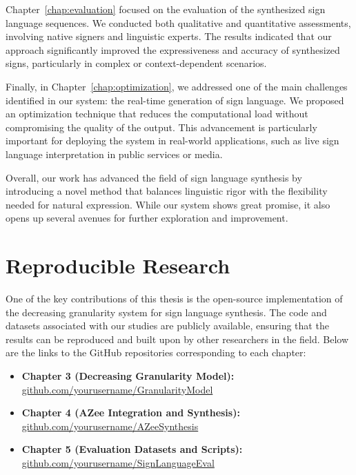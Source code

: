 \documentclass[../../main.tex]{subfiles}
\begin{document}
Chapter~\ref{chap:evaluation} focused on the evaluation of the synthesized sign language sequences. We conducted both qualitative and quantitative assessments, involving native signers and linguistic experts. The results indicated that our approach significantly improved the expressiveness and accuracy of synthesized signs, particularly in complex or context-dependent scenarios.

Finally, in Chapter~\ref{chap:optimization}, we addressed one of the main challenges identified in our system: the real-time generation of sign language. We proposed an optimization technique that reduces the computational load without compromising the quality of the output. This advancement is particularly important for deploying the system in real-world applications, such as live sign language interpretation in public services or media.

Overall, our work has advanced the field of sign language synthesis by introducing a novel method that balances linguistic rigor with the flexibility needed for natural expression. While our system shows great promise, it also opens up several avenues for further exploration and improvement.

\section{Reproducible Research}
\label{sec:opensource}

One of the key contributions of this thesis is the open-source implementation of the decreasing granularity system for sign language synthesis. The code and datasets associated with our studies are publicly available, ensuring that the results can be reproduced and built upon by other researchers in the field. Below are the links to the GitHub repositories corresponding to each chapter:

\begin{itemize}
    \item \textbf{Chapter 3 (Decreasing Granularity Model):}
    \url{github.com/yourusername/GranularityModel}
    
    \item \textbf{Chapter 4 (AZee Integration and Synthesis):}
    \url{github.com/yourusername/AZeeSynthesis}
    
    \item \textbf{Chapter 5 (Evaluation Datasets and Scripts):}
    \url{github.com/yourusername/SignLanguageEval}
\end{itemize}
\end{document}
